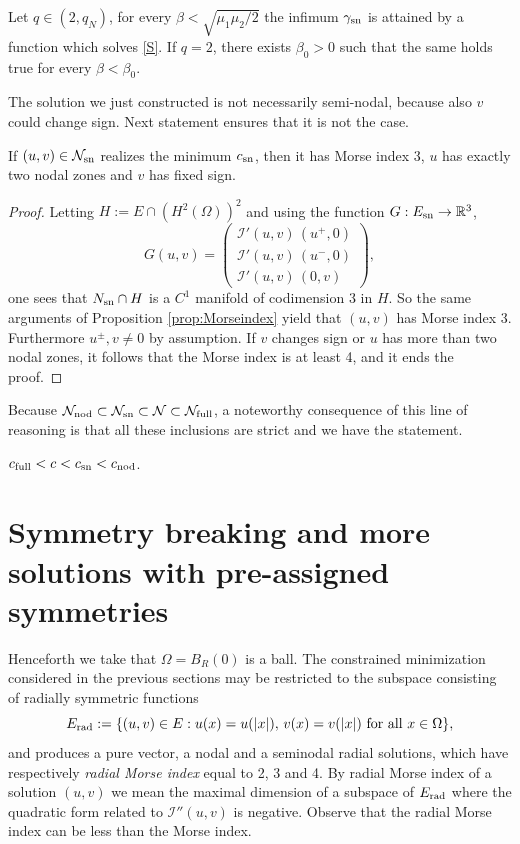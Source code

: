 \documentclass[reqno]{amsart}
\begin{document}
\begin{proposition}\label{prop:seminodal1}
Let $q\in (2,q_N)$, for every $\beta < \sqrt{\mu_1\mu_2/2}$ the infimum $\gamma_{\rm sn}$
is attained by a function which solves \eqref{S}.
If $q=2$, there exists $\beta_0>0$ such that the same holds true for every
$\beta<\beta_0$.
\end{proposition}

The solution we  just constructed is not necessarily semi-nodal, because also $v$
could change sign. Next statement ensures that it is not the case.

\begin{proposition}\label{prop:seminodal2}
If $(u,v)\in \mathcal N_{\rm sn}$ realizes the minimum $c_{\rm sn}$, then it has
Morse index 3, $u$ has exactly two nodal zones and  $v$ has fixed sign.
\end{proposition}

\begin{proof}
Letting  $H:=E\cap \left(H^2(\Omega)\right)^2$ and using the function
$G:E_{\rm sn}\to\mathbb{R}^3$,
\[
G(u,v)=\begin{pmatrix}
\mathcal I'(u,v) \, (u^+,0) \\ \mathcal I'(u,v) \, (u^-,0) \\
\mathcal I'(u,v) \, (0,v)
 \end{pmatrix},
\]
one sees that $N_{\rm sn}\cap H$ is a $C^1$ manifold of codimension 3 in $H$.
So the same arguments of Proposition \ref{prop:Morseindex} yield that $(u,v)$
has Morse index 3.
Furthermore $u^{\pm} , v\neq 0$ by assumption. If $v$ changes sign or $u$ has more
than two nodal zones, it follows that the Morse index is at least 4, and it ends
the proof.
\end{proof}

Because $\mathcal N_{\rm nod} \subset \mathcal N_{\rm sn} \subset \mathcal N\subset
\mathcal N_{\rm full}$, a noteworthy consequence of this line of reasoning  is that
 all these inclusions are strict and we have the statement.

\begin{theorem}
$c_{\rm full} < c <c_{\rm sn} < c_{\rm nod}$.
\end{theorem}

\section{Symmetry breaking and more solutions with pre-assigned symmetries}\label{sec3}

Henceforth we take that $\Omega=B_R(0)$ is a ball.
The constrained minimization considered in the previous sections may be restricted
to the subspace consisting of radially symmetric functions
\[
E_{\rm rad}:=\{(u,v)\in E  : u(x)=u(|x|), \,
v(x)=v(|x|) \text{ for all } x\in \Omega \} ,
\]
and produces a pure vector, a nodal and a seminodal radial solutions, which have
respectively \emph{radial Morse index} equal to 2, 3 and 4.
By radial Morse index of a solution $(u,v)$ we mean the maximal dimension of a subspace
of $E_{\rm rad}$ where the quadratic form related to $\mathcal I''(u,v)$ is negative.
Observe that the radial Morse index can be less than the Morse index.
\end{document}
